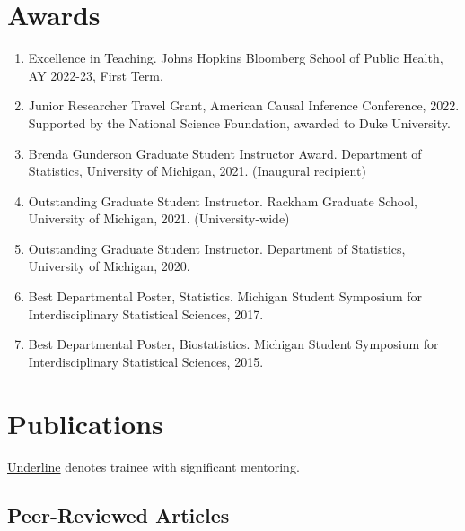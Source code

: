 \documentclass[letterpaper,11pt]{article} %
\begin{document}
	\section*{Awards}
	\begin{enumerate}
		\item Excellence in Teaching. Johns Hopkins Bloomberg School of Public Health, AY 2022-23, First Term.
		\item Junior Researcher Travel Grant, American Causal Inference Conference, 2022. Supported by the National Science Foundation, awarded to Duke University.
		\item Brenda Gunderson Graduate Student Instructor Award. Department of Statistics, University of Michigan, 2021. (Inaugural recipient)
		\item Outstanding Graduate Student Instructor. Rackham Graduate School, University of Michigan, 2021. (University-wide)
		\item Outstanding Graduate Student Instructor. Department of Statistics, University of Michigan, 2020.
		\item Best Departmental Poster, Statistics. Michigan Student Symposium for Interdisciplinary Statistical Sciences, 2017.
		\item Best Departmental Poster, Biostatistics. Michigan Student Symposium for Interdisciplinary Statistical Sciences, 2015.
	\end{enumerate}
	
	\section*{Publications}
    
    {\small \underline{Underline} denotes trainee with significant mentoring.}
    
	\subsection*{Peer-Reviewed Articles}
	
\end{document}

